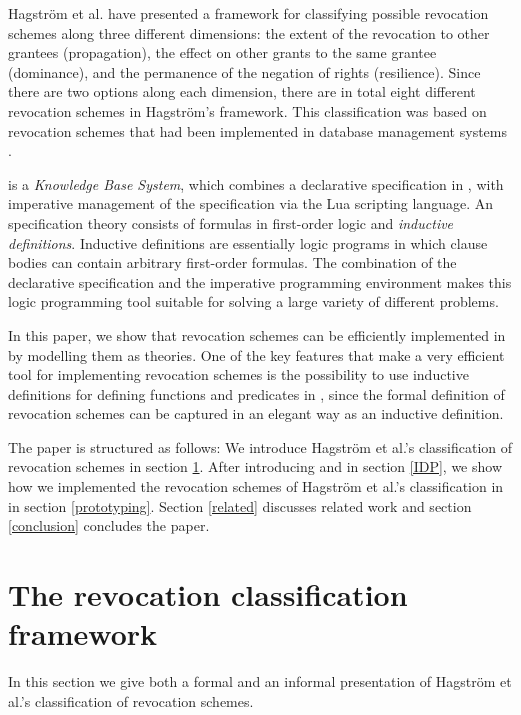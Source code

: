 \documentclass[runningheads]{llncs}
\newcommand{\logicname}[1]{\text{\sc #1}\xspace}
\newcommand{\idp}{\logicname{IDP}}
\newcommand{\fodot}{\logicname{FO(\ensuremath{\cdot})}}
\begin{document}
Hagstr\"om et al. \cite{Hagstrom} have presented a framework for classifying possible revocation schemes along three different dimensions: the extent of the revocation to other grantees (propagation), the effect on other grants to the same grantee (dominance), and the permanence of the negation of rights (resilience). Since there are two options along each dimension, there are in total eight different revocation schemes in Hagstr\"om's framework. This classification was based on revocation schemes that had been implemented in database management systems \cite{Griffiths,Fagin,Bertino96,Bertino97}.


\idp is a \emph{Knowledge Base System}, which combines a declarative specification in \fodot, with imperative management of the specification via the Lua scripting language. An \fodot specification theory consists of formulas in first-order logic and \emph{inductive definitions}. 
Inductive definitions are essentially logic programs in which clause bodies can contain arbitrary first-order formulas.
The combination of the declarative specification and the imperative programming environment makes this logic programming tool suitable for solving a large variety of different problems.

In this paper, we show that revocation schemes can be efficiently implemented in \idp by modelling them as \idp theories. One of the key features that make \idp a very efficient tool for implementing revocation schemes is the possibility to use inductive definitions for defining functions and predicates in \fodot, since the formal definition of revocation schemes can be captured in an elegant way as an inductive definition. 

The paper is structured as follows: We introduce Hagstr\"om et al.'s classification of revocation schemes in section \ref{rs}. After introducing \fodot and \idp in section \ref{IDP}, we show how we implemented the revocation schemes of Hagstr\"om et al.'s classification in \idp in section \ref{prototyping}. Section \ref{related} discusses related work and section \ref{conclusion} concludes the paper.

\makeatletter{}\section{The revocation classification framework}
\label{rs}
In this section we give both a formal and an informal presentation of Hagstr\"om et al.'s \cite{Hagstrom} classification of revocation schemes. 
\end{document}
